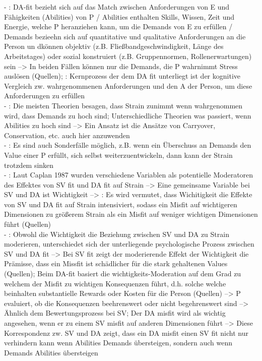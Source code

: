 - \cite[S. 5]{edwards:1996}: DA-fit bezieht sich auf das Match zwischen Anforderungen von E und Fähigkeiten (Abilities) von P / Abilities enthalten Skills, Wissen, Zeit und Energie, welche P heranziehen kann, um die Demands von E zu erfüllen / Demands bezieehn sich auf quantitative und qualitative Anforderungen an die Person un dkönnen objektiv (z.B. Fließbandgeschwindigkeit, Länge des Arbeitstages) oder sozial konstruiert (z.B. Gruppennormen, Rollenerwartungen) sein --> In beiden Fällen können nur die Demands, die P wahrnimmt Stress auslösen (Quellen); \cite[S. 5f.]{edwards:1996}: Kernprozess der dem DA fit unterliegt ist der kognitive Vergleich zw. wahrgenommenen Anforderungen und den A der Person, um diese Anforderungen zu erfüllen \\
- \cite[S. 6]{edwards:1996}: Die meisten Theorien besagen, dass Strain zunimmt wenn wahrgenommen wird, dass Demands zu hoch sind; Unterschiedliche Theorien was passiert, wenn Abilities zu hoch sind --> Ein Ansatz ist die Ansätze von Carryover, Conservation, etc. auch hier anzuwenden \\
- \cite[S. 9]{edwards:1996}: Es sind auch Sonderfälle möglich, z.B. wenn ein Überschuss an Demands den Value einer P erfüllt, sich selbst weiterzuentwickeln, dann kann der Strain trotzdem sinken \\
- \cite[S. 9]{edwards:1996}: Laut Caplan 1987 wurden verschiedene Variablen als potentielle Moderatoren des Effektes von SV fit und DA fit auf Strain --> Eine gemeinsame Variable bei SV und DA ist Wichtigkeit --> \cite[S. 10]{edwards:1996}: Es wird vermutet, dass Wichitigkeit die Effekte von SV und DA fit auf Strain intensiviert, sodass ein Misfit auf wichtigeren Dimensionen zu größerem Strain als ein Misfit auf weniger wichtigen Dimensionen führt (Quellen)\\
- \cite[S. 10]{edwards:1996}: Obwohl die Wichtigkeit die Beziehung zwischen SV und DA zu Strain moderieren, unterschiedet sich der unterliegende psychologische Prozess zwischen SV und DA fit --> Bei SV fit zeigt der moderierende Effekt der Wichtigkeit die Prämisse, dass ein Missfit ist schädlicher für die stark gehaltenen Values (Quellen); Beim DA-fit basiert die wichtigkeits-Moderation auf dem Grad zu welchem der Misfit zu wichtigen Konsequenzen führt, d.h. solche welche beinhalten substantielle Rewards oder Kosten für die Person (Quellen) --> P evaluiert, ob die Konsequenzen beehrenswert oder nicht begehrenswert sind --> Ähnlich dem Bewertungsprozess bei SV; Der DA misfit wird als wichtig angesehen, wenn er zu einem SV misfit auf anderen Dimensionen führt --> Diese Korrespondenz zw. SV und DA zeigt, dass ein DA misfit einen SV fit nicht nur verhindern kann wenn Abilities Demands übersteigen, sondern auch wenn Demands Abilities übersteigen \\
